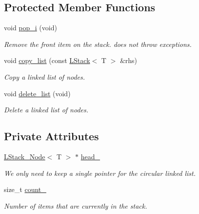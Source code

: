 \subsection*{Protected Member Functions}
\begin{DoxyCompactItemize}
\item 
void \hyperlink{classMadara_1_1Utility_1_1LStack_a4920f640a68f72acc86526d09fbc7ef1}{pop\_\-i} (void)
\begin{DoxyCompactList}\small\item\em Remove the front item on the stack. does not throw exceptions. \item\end{DoxyCompactList}\item 
void \hyperlink{classMadara_1_1Utility_1_1LStack_a9c41163ed606d4ef4a7032c51d86b830}{copy\_\-list} (const \hyperlink{classMadara_1_1Utility_1_1LStack}{LStack}$<$ T $>$ \&rhs)
\begin{DoxyCompactList}\small\item\em Copy a linked list of nodes. \item\end{DoxyCompactList}\item 
void \hyperlink{classMadara_1_1Utility_1_1LStack_a2638a0cc3febec3bdf84808316011b46}{delete\_\-list} (void)
\begin{DoxyCompactList}\small\item\em Delete a linked list of nodes. \item\end{DoxyCompactList}\end{DoxyCompactItemize}
\subsection*{Private Attributes}
\begin{DoxyCompactItemize}
\item 
\hyperlink{classMadara_1_1Utility_1_1LStack__Node}{LStack\_\-Node}$<$ T $>$ $\ast$ \hyperlink{classMadara_1_1Utility_1_1LStack_aac3272ea2660d46d19513dba8118a3e8}{head\_\-}
\begin{DoxyCompactList}\small\item\em We only need to keep a single pointer for the circular linked list. \item\end{DoxyCompactList}\item 
size\_\-t \hyperlink{classMadara_1_1Utility_1_1LStack_a64be724a51b269619e725752a4ea221b}{count\_\-}
\begin{DoxyCompactList}\small\item\em Number of items that are currently in the stack. \item\end{DoxyCompactList}\end{DoxyCompactItemize}
